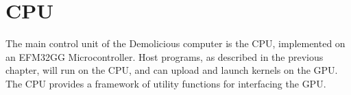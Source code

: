 \documentclass[../main/report.tex]{subfiles}
\begin{document}
\chapter{CPU}

The main control unit of the Demolicious computer is the CPU, implemented on an EFM32GG Microcontroller. Host programs, as described in the previous chapter, will run on the CPU,
and can upload and launch kernels on the GPU.
The CPU provides a framework of utility functions for interfacing the GPU.










\end{document}
